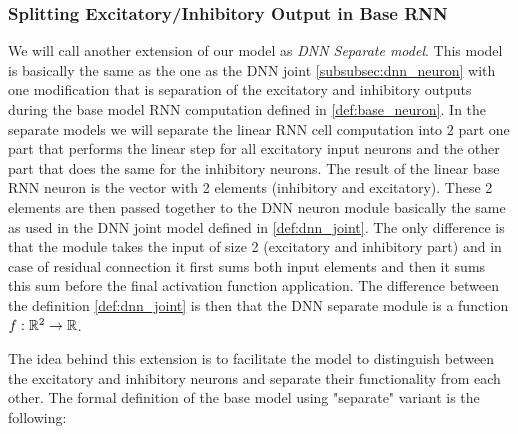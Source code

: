 \subsubsection{Splitting Excitatory/Inhibitory Output in Base RNN}
\label{subsubsec:dnn_separate}
We will call another extension of our model as \emph{DNN Separate model}. This model is basically the same as the one as the DNN joint \ref{subsubsec:dnn_neuron} with one modification that is separation of the excitatory and inhibitory outputs during the base model RNN computation defined in \ref{def:base_neuron}. In the separate models we will separate the linear RNN cell computation into 2 part one part that performs the linear step for all excitatory input neurons and the other part that does the same for the inhibitory neurons. The result of the linear base RNN neuron is the vector with 2 elements (inhibitory and excitatory). These 2 elements are then passed together to the DNN neuron module basically the same as used in the DNN joint model defined in \ref{def:dnn_joint}. The only difference is that the module takes the input of size 2 (excitatory and inhibitory part) and in case of residual connection it first sums both input elements and then it sums this sum before the final activation function application. The difference between the definition \ref{def:dnn_joint} is then that the DNN separate module is a function $f: \mathbb{R}^2 \to \mathbb{R}$.

The idea behind this extension is to facilitate the model to distinguish between the excitatory and inhibitory neurons and separate their functionality from each other. The formal definition of the base model using "separate" variant is the following:

